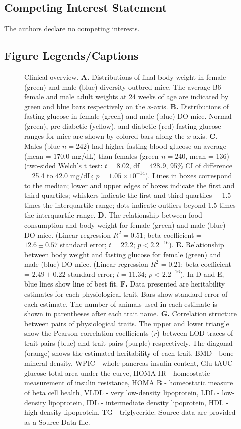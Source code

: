 \documentclass[
]{article}
\begin{document}
\subsection{Competing Interest
Statement}\label{competing-interest-statement}

The authors declare no competing interests.

\subsection{Figure Legends/Captions}\label{figure-legendscaptions}

\begin{figure}[ht!]
\caption{Clinical overview. \textbf{A.} Distributions of final body 
weight in female (green) and male (blue) diversity outbred mice.
The average B6 female and male adult weights at 24 weeks of 
age are indicated by green and blue bars respectively on the 
$x$-axis. \textbf{B.} Distributions of fasting glucose in female 
(green) and male (blue) DO mice. Normal (green), pre-diabetic
(yellow), and diabetic (red) fasting glucose ranges for mice are 
shown by colored bars along the $x$-axis. \textbf{C.} Males 
(blue $n = 242$) had higher fasting blood glucose on average 
(mean = 170.0 mg/dL) than females (green $n = 240$, 
mean = 136) (two-sided Welch's t test: $t = 8.02$, 
df = 428.9, 95\% CI of difference = 25.4 to 42.0 mg/dL; 
$p = 1.05\times10^{-14}$). Lines in boxes 
correspond to the median; lower and upper edges of 
boxes indicate the first and third quartiles; whiskers 
indicate the first and third quartiles $\pm$ 1.5 times
the interquartile range; dots indicate outliers beyond 1.5 times
the interquartile range. \textbf{D.} The relationship between 
food consumption and body weight for female (green) and 
male (blue) DO mice. (Linear regression 
$R^2 = 0.51$;  beta coefficient = $12.6\pm0.57$ 
standard error; $t = 22.2$; $p < 2.2^{-16}$). \textbf{E.} 
Relationship between body weight and fasting glucose for 
female (green) and male (blue) DO mice. (Linear regression 
$R^2 = 0.21$; beta coefficient = $2.49\pm 0.22$ 
standard error; $t = 11.34$; $p < 2.2^{-16}$). In D and E,
blue lines show line of best fit. \textbf{F.} Data 
presented are heritability estimates for each physiological trait. 
Bars show standard error of each estimate. The number of animals 
used in each estimate is shown in parentheses after each trait name. 
\textbf{G.} Correlation structure between pairs of physiological 
traits. The upper and lower triangle show the Pearson correlation 
coefficients ($r$) between LOD traces of trait pairs (blue) and trait 
pairs (purple) respectively. The diagonal (orange) shows the estimated 
heritability of each trait. BMD - bone mineral density, WPIC - whole 
pancreas insulin content, Glu tAUC - glucose total area under the 
curve, HOMA IR - homeostatic measurement of insulin resistance, 
HOMA B - homeostatic measure of beta cell health, VLDL - very 
low-density lipoprotein, LDL - low-density lipoprotein, IDL - intermediate 
density lipoprotein, HDL - high-density lipoprotein, TG - triglyceride. 
Source data are provided as a Source Data file.
}
\label{fig:trait_overview}
\end{figure}
\end{document}
